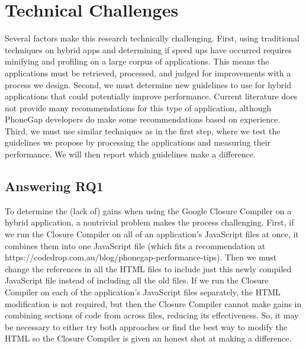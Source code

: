 \documentclass{acm_proc_article-sp}
\begin{document}
\section{Technical Challenges}
Several factors make this research technically challenging.
First, using traditional techniques on hybrid apps and determining if speed ups have occurred requires minifying and profiling on a large corpus of applications.
This means the applications must be retrieved, processed, and judged for improvements with a process we design.
Second, we must determine new guidelines to use for hybrid applications that could potentially improve performance.
Current literature does not provide many recommendations for this type of application, although PhoneGap developers do make some recommendations based on experience.
Third, we must use similar techniques as in the first step, where we test the guidelines we propose by processing the applications and measuring their performance.  We will then report which guidelines make a difference.

\subsection{Answering RQ1}
To determine the (lack of) gains when using the Google Closure Compiler on a hybrid application, a nontrivial problem makes the process challenging.
First, if we run the Closure Compiler on all of an application's JavaScript files at once, it combines them into one JavaScript file (which fits a recommendation at https://codedrop.com.au/blog/phonegap-performance-tips). 
Then we must change the references in all the HTML files to include just this newly compiled JavaScript file instead of including all the old files.
If we run the Closure Compiler on each of the application's JavaScript files separately, the HTML modification is not required, but then the Closure Compiler cannot make gains in combining sections of code from across files, reducing its effectiveness. 
So, it may be necessary to either try both approaches or find the best way to modify the HTML so the Closure Compiler is given an honest shot at making a difference.
\end{document}
